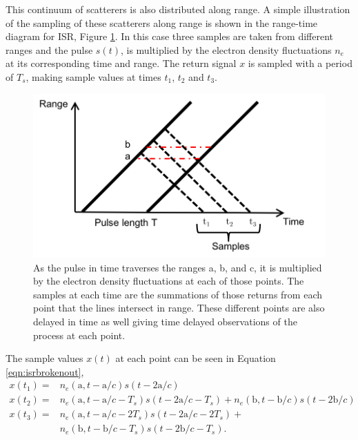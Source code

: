 This continuum of scatterers is also distributed along range. A simple illustration of the sampling of these scatterers along range is shown in the range-time diagram for ISR, Figure \ref{fig:isrfigure}. In this case three samples are taken from different ranges and the pulse $s(t)$, is multiplied by the electron density fluctuations $n_e$ at its corresponding time and range. The return signal $x$ is sampled with a period of $T_s$, making sample values at times $t_1$, $t_2$ and $t_3$. 
\begin{figure}[htb]
\centering
\includegraphics[width=5in]{ISRpicture}
\caption{As the pulse in time traverses the ranges a, b, and c, it is multiplied by the electron density fluctuations at each of those points. The samples at each time are the summations of those returns from each point that the lines intersect in range. These different points are also delayed in time as well giving time delayed observations of the process at each point. }
\label{fig:isrfigure}
\end{figure}
The sample values $x(t)$ at each point can be seen in Equation \ref{eqn:isrbrokenout},
\begin{equation}
\label{eqn:isrbrokenout}
\begin{split}
 x(t_1)=& n_e(\text{a},t-\text{a}/c)s(t-2\text{a}/c) \\ 
 x(t_2)=& n_e(\text{a},t-\text{a}/c-T_s)s(t-2\text{a}/c-T_s) +  n_e(\text{b},t-\text{b}/c)s(t-2\text{b}/c)\\
 x(t_3)=& n_e(\text{a},t-\text{a}/c-2T_s)s(t-2\text{a}/c-2T_s)   +
 \\ & n_e(\text{b},t-\text{b}/c-T_s)s(t-2\text{b}/c-T_s). 
 \end{split}
\end{equation}

